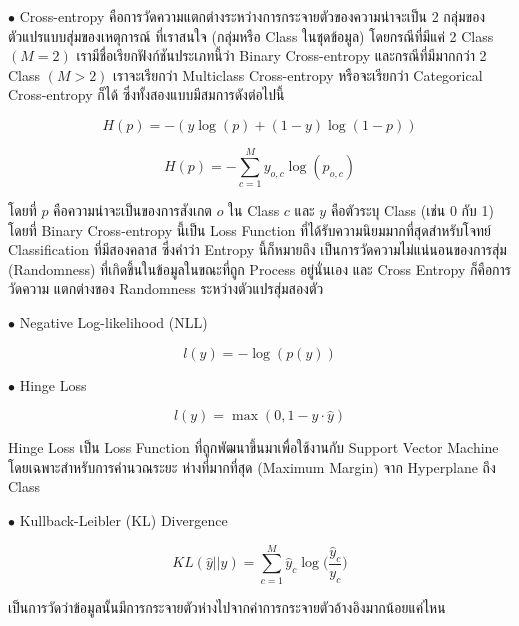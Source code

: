 \noindent $\bullet$ Cross-entropy คือการวัดความแตกต่างระหว่างการกระจายตัวของความน่าจะเป็น 2 กลุ่มของตัวแปรแบบสุ่มของเหตุการณ์%
ที่เราสนใจ (กลุ่มหรือ Class ในชุดข้อมูล) โดยกรณีที่มีแค่ 2 Class $(M = 2)$ เรามีชื่อเรียกฟังก์ชันประเภทนี้ว่า Binary Cross-entropy
และกรณีที่มีมากกว่า 2 Class $(M > 2)$ เราจะเรียกว่า Multiclass Cross-entropy หรือจะเรียกว่า Categorical Cross-entropy ก็ได้
ซึ่งทั้งสองแบบมีสมการดังต่อไปนี้

\begin{equation}\label{eq:binary_entro}
    H(p) = -{(y\log(p) + (1 - y)\log(1 - p))}
\end{equation}

\begin{equation}\label{eq:multiclass_entro}
    H(p) = -\sum_{c=1}^My_{o,c}\log(p_{o,c})
\end{equation}

\noindent โดยที่ $p$ คือความน่าจะเป็นของการสังเกต $o$ ใน Class $c$ และ $y$ คือตัวระบุ Class (เช่น 0 กับ 1) โดยที่ Binary
Cross-entropy นี้เป็น Loss Function ที่ได้รับความนิยมมากที่สุดสำหรับโจทย์ Classification ที่มีสองคลาส ซึ่งคำว่า Entropy นี้ก็หมายถึง%
เป็นการวัดความไม่แน่นอนของการสุ่ม (Randomness) ที่เกิดขึ้นในข้อมูลในขณะที่ถูก Process อยู่นั่นเอง และ Cross Entropy ก็คือการวัดความ%
แตกต่างของ Randomness ระหว่างตัวแปรสุ่มสองตัว

\noindent $\bullet$ Negative Log-likelihood (NLL)

\begin{equation}\label{eq:neg_log_like}
    l(y) = -{\log(p(y))}
\end{equation}

\noindent $\bullet$ Hinge Loss

\begin{equation}\label{eq:hinge_loss}
    l(y) = \max(0, 1 - y \cdot \hat{y})
\end{equation}

\noindent Hinge Loss เป็น Loss Function ที่ถูกพัฒนาขึ้นมาเพื่อใช้งานกับ Support Vector Machine โดยเฉพาะสำหรับการคำนวณระยะ%
ห่างที่มากที่สุด (Maximum Margin) จาก Hyperplane ถึง Class

\noindent $\bullet$ Kullback-Leibler (KL) Divergence

\begin{equation}\label{eq:kl_diver}
    KL(\hat{y} || y) = \sum_{c=1}^{M}\hat{y}_c \log \bigg( {\frac{\hat{y}_c}{y_c}} \bigg)
\end{equation}

\noindent เป็นการวัดว่าข้อมูลนั้นมีการกระจายตัวห่างไปจากค่าการกระจายตัวอ้างอิงมากน้อยแค่ไหน

